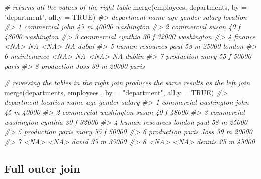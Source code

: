 \documentclass[
]{book}
\newenvironment{Shaded}{\begin{snugshade}}{\end{snugshade}}
\newcommand{\AttributeTok}[1]{\textcolor[rgb]{0.77,0.63,0.00}{#1}}
\newcommand{\CommentTok}[1]{\textcolor[rgb]{0.56,0.35,0.01}{\textit{#1}}}
\newcommand{\ConstantTok}[1]{\textcolor[rgb]{0.00,0.00,0.00}{#1}}
\newcommand{\FunctionTok}[1]{\textcolor[rgb]{0.00,0.00,0.00}{#1}}
\newcommand{\NormalTok}[1]{#1}
\newcommand{\StringTok}[1]{\textcolor[rgb]{0.31,0.60,0.02}{#1}}
\begin{document}
\begin{Shaded}
\begin{Highlighting}[]
\CommentTok{\# returns all the values of the right table}
\FunctionTok{merge}\NormalTok{(employees, departments, }\AttributeTok{by =} \StringTok{"department"}\NormalTok{, }\AttributeTok{all.y =} \ConstantTok{TRUE}\NormalTok{)}
\CommentTok{\#\textgreater{}        department    name age gender salary   location}
\CommentTok{\#\textgreater{} 1      commercial    john  45      m  40000 washington}
\CommentTok{\#\textgreater{} 2      commercial   susan  40      f  48000 washington}
\CommentTok{\#\textgreater{} 3      commercial cynthia  30      f  32000 washington}
\CommentTok{\#\textgreater{} 4         finance    \textless{}NA\textgreater{}  NA   \textless{}NA\textgreater{}     NA      dubai}
\CommentTok{\#\textgreater{} 5 human resources    paul  58      m  25000     london}
\CommentTok{\#\textgreater{} 6     maintenance    \textless{}NA\textgreater{}  NA   \textless{}NA\textgreater{}     NA     dublin}
\CommentTok{\#\textgreater{} 7      production    mary  55      f  50000      paris}
\CommentTok{\#\textgreater{} 8      production    Joss  39      m  20000      paris}

\CommentTok{\# reversing the tables in the right join produces the same results as the left join}
\FunctionTok{merge}\NormalTok{(departments, employees , }\AttributeTok{by =} \StringTok{"department"}\NormalTok{, }\AttributeTok{all.y =} \ConstantTok{TRUE}\NormalTok{)}
\CommentTok{\#\textgreater{}        department   location    name age gender salary}
\CommentTok{\#\textgreater{} 1      commercial washington    john  45      m  40000}
\CommentTok{\#\textgreater{} 2      commercial washington   susan  40      f  48000}
\CommentTok{\#\textgreater{} 3      commercial washington cynthia  30      f  32000}
\CommentTok{\#\textgreater{} 4 human resources     london    paul  58      m  25000}
\CommentTok{\#\textgreater{} 5      production      paris    mary  55      f  50000}
\CommentTok{\#\textgreater{} 6      production      paris    Joss  39      m  20000}
\CommentTok{\#\textgreater{} 7            \textless{}NA\textgreater{}       \textless{}NA\textgreater{}   david  35      m  35000}
\CommentTok{\#\textgreater{} 8            \textless{}NA\textgreater{}       \textless{}NA\textgreater{}  dennis  25      m  45000}
\end{Highlighting}
\end{Shaded}

\hypertarget{full-outer-join}{%
\subsection{Full outer join}\label{full-outer-join}}
\end{document}

